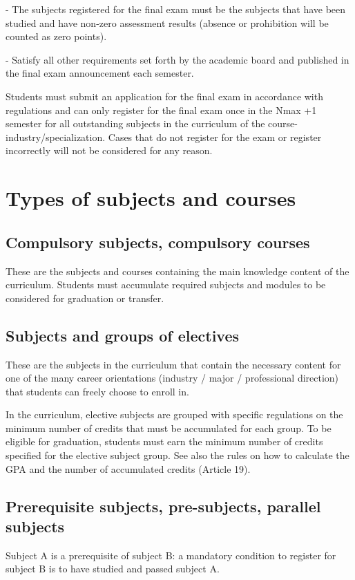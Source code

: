 - The subjects registered for the final exam must be the subjects that have been studied and have non-zero assessment results (absence or prohibition will be counted as zero points).

- Satisfy all other requirements set forth by the academic board and published in the final exam announcement each semester.

Students must submit an application for the final exam in accordance with regulations and can only register for the final exam once in the Nmax +1 semester for all outstanding subjects in the curriculum of the course-industry/specialization. Cases that do not register for the exam or register incorrectly will not be considered for any reason.

\section{Types of subjects and courses}
\subsection{Compulsory subjects, compulsory courses}
These are the subjects and courses containing the main knowledge content of the curriculum. Students must accumulate required subjects and modules to be considered for graduation or transfer.

\subsection{Subjects and groups of electives}
These are the subjects in the curriculum that contain the necessary content for one of the many career orientations (industry / major / professional direction) that students can freely choose to enroll in.

In the curriculum, elective subjects are grouped with specific regulations on the minimum number of credits that must be accumulated for each group. To be eligible for graduation, students must earn the minimum number of credits specified for the elective subject group. See also the rules on how to calculate the GPA and the number of accumulated credits (Article 19).

\subsection{Prerequisite subjects, pre-subjects, parallel subjects}
Subject A is a prerequisite of subject B: a mandatory condition to register for subject B is to have studied and passed subject A.

